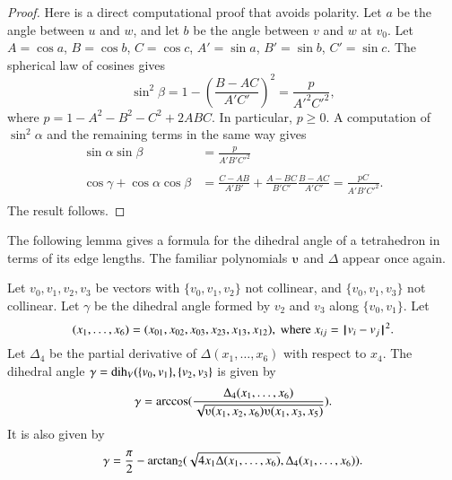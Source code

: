 \begin{proof}  
Here is a direct
computational proof that avoids polarity.
Let $a$ be the angle between $u$ and $w$, and let $b$ be the angle
between $v$ and $w$ at $v_0$.
Let $A=\cos a$, $B=\cos b$, $C=\cos c$,
$A'=\sin a$, $B'=\sin b$, $C'=\sin c$.  The
spherical law of cosines gives
   $$\sin^2\beta = 1-\left(\frac{B-A C}{A' C'}\right)^2
     = \frac{p}{A'^2 C'^2},$$
where $p=1-A^2 - B^2 - C^2 + 2 A B C$.
In particular, $p\ge 0$.
%
A computation of $\sin^2\alpha$ and the remaining terms in the same way gives
   $$
   \begin{array}{lll}
     \sin\alpha\sin\beta &= \frac{\displaystyle p}{\displaystyle A' B' C'^2}\\ 
      \\
     \cos\gamma + \cos\alpha \cos\beta &=
         \frac{\displaystyle C - A B}{\displaystyle A' B'} + \frac{\displaystyle A - B C}{\displaystyle B' C'} \frac{\displaystyle B - A C}{\displaystyle A' C'}
         = \frac{\displaystyle p C}{\displaystyle A' B' C'^2}.\\
   \end{array}
   $$
The result follows.
\end{proof}

The following lemma gives a formula for the dihedral angle
of a tetrahedron in terms of its edge lengths.  The
familiar polynomials $\ups$ and $\Delta$ appear once again.
%
%


\begin{lemma} \label{lemma:dihform}
Let $v_0,v_1,v_2,v_3$ 
be vectors with $\{v_0,v_1,v_2\}$ not collinear, 
and $\{v_0,v_1,v_3\}$ not
collinear. 
Let $\gamma$ be the dihedral angle formed
by $v_2$ and $v_3$ along $\{v_0,v_1\}$. Let
    $$(x_1,\ldots,x_6) = 
    (x_{01},x_{02},x_{03},x_{23},x_{13},x_{12}),
    \text{ where } x_{ij}={\hskip0.1em|\hskip-0.15em|\hskip0.1em}v_i - v_j{\hskip0.1em|\hskip-0.15em|\hskip0.1em}^2.$$
Let $\Delta_4$ be the partial derivative of $\Delta(x_1,\ldots,x_6)$ with
respect to $x_4$.
The dihedral angle $\gamma=\operatorname{dih}_V(\{v_0,v_1\},\{v_2,v_3\}$
is given by
    $$
    \gamma=\arccos(\frac{\Delta_4(x_1,\ldots,x_6)}{\sqrt{
    \ups(x_1,x_2,x_6)\ups(x_1,x_3,x_5)}}).
    $$
It is also given by
    $$
    \gamma=\frac{\pi}{2} - {\operatorname{arctan_2}}
     ({\sqrt{4 x_1 \Delta(x_1,\ldots,x_6)}},{\Delta_4(x_1,\ldots,x_6)}).
    $$
\end{lemma}
%


